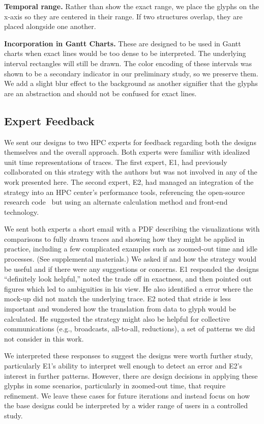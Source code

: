 \vspace{1ex}

\textbf{Temporal range.} Rather than show the exact range, we place the glyphs on the x-axis so they are centered in their range. If two structures overlap, they are placed alongside one another. 

\vspace{1ex}

\textbf{Incorporation in Gantt Charts.} These are designed to be used in Gantt charts when exact lines would be too dense to be interpreted. The underlying interval rectangles will still be drawn. The color encoding of these intervals was shown to be a secondary indicator in our preliminary study, so we preserve them. We add a slight blur effect to the background as another signifier that the glyphs are an abstraction and should not be confused for exact lines.



\subsection{Expert Feedback}
\label{sec:expertfeedback}

We sent our designs to two HPC experts for feedback regarding both the designs themselves and the overall approach. Both experts were familiar with idealized unit time representations of traces. The first expert, E1, had previously collaborated on this strategy with the authors but was not involved in any of the work presented here. The second expert, E2, had managed an integration of the strategy into an HPC center's performance tools, referencing the open-source research code~\cite{isaacs2014combing} but using an alternate calculation method and front-end technology.

We sent both experts a short email with a PDF describing the visualizations with comparisons to fully drawn traces and showing how they might be applied in practice, including a few complicated examples such as zoomed-out time and idle processes. (See supplemental materials.) We asked if and how the strategy would be useful and if there were any suggestions or concerns. E1 responded the designs ``definitely look helpful,'' noted the trade off in exactness, and then pointed out figures which led to ambiguities in his view. He also identified a error where the mock-up did not match the underlying trace. E2 noted that stride is less important and wondered how the translation from data to glyph would be calculated. He suggested the strategy might also be helpful for collective communications (e.g., broadcasts, all-to-all, reductions), a set of patterns we did not consider in this work.

We interpreted these responses to suggest the designs were worth further study, particularly E1's ability to interpret well enough to detect an error and E2's interest in further patterns. However, there are design decisions in applying these glyphs in some scenarios, particularly in zoomed-out time, that require refinement. We leave these cases for future iterations and instead focus on how the base designs could be interpreted by a wider range of users in a controlled study.